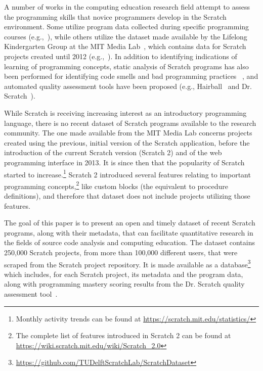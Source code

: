 \documentclass[10pt, conference]{IEEEtran}
\begin{document}
A number of works in the computing education research field attempt to assess the programming skills that novice programmers develop in the Scratch environment.
Some utilize program data collected during specific programming courses (e.g.,~\cite{meerbaum-salant_learning_2010, wilson_evaluation_2012, Maloney_2008}), while others utilize the dataset made available by the Lifelong Kindergarten Group at the MIT Media Lab~\cite{2017_scratch_dataset}, which contains data for Scratch projects created until 2012 (e.g.,~\cite{fields_2014, yang_2015, Dasgupta_2016}).
In addition to identifying indications of learning of programming concepts, static analysis of Scratch programs has also been performed for identifying code smells and bad programming practices ~\cite{Meerbaum_habits_2011, Aivaloglou_2016}, and automated quality assessment tools have been proposed (e.g., Hairball~\cite{boe_hairball:_2013} and Dr. Scratch~\cite{moreno_automatic_2014}).

While Scratch is receiving increasing interest as an introductory programming language, there is no recent dataset of Scratch programs available to the research community.
The one made available from the MIT Media Lab concerns projects created using the previous, initial version of the Scratch application, before the introduction of the current Scratch version (Scratch 2) and of the web programming interface in 2013.
It is since then that the popularity of Scratch started to increase.\footnote{Monthly activity trends can be found at \url{https://scratch.mit.edu/statistics/}}
Scratch 2 introduced several features relating to important programming concepts,\footnote{The complete list of features introduced in Scratch 2 can be found at \url{https://wiki.scratch.mit.edu/wiki/Scratch_2.0}} like custom blocks (the equivalent to procedure definitions), and therefore that dataset does not include projects utilizing those features.

The goal of this paper is to present an open and timely dataset of recent Scratch programs, along with their metadata, that can facilitate quantitative research in the fields of source code analysis and computing education.
The dataset contains 250,000 Scratch projects, from more than 100,000 different users, that were scraped from the Scratch project repository.
It is made available as a database\footnote{\label{dataseturl}\url{https://github.com/TUDelftScratchLab/ScratchDataset}} which includes, for each Scratch project, its metadata and the program data, along with programming mastery scoring results from the Dr. Scratch quality assessment tool~\cite{moreno_automatic_2014}.
\end{document}
